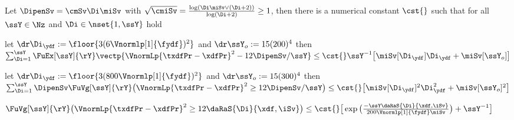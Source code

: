 \begin{lm}\label{ak:re:rest}Let $\DipenSv=\cmSv \Di \miSv$
  with
  $\sqrt{\cmiSv}=\tfrac{\log (\Di\miSv \vee
    (\Di+2))}{\log(\Di+2)}\geq1$, then there is a numerical constant
  $\cst{}$ such that for all $\ssY\in\Nz$ and
  $\Di\in\nset{1,\ssY}$ hold
  \begin{resListeN}[]
  \item\label{ak:re:rest:i} let $\dr\Di_{\ydf}:=\floor{  3(6\Vnormlp[1]{\fydf})^2}$ and $\dr \ssY_{o}:={15(200)^4}$ then\\ 
    $\sum_{\Di=1}^{\ssY}\FuEx[\ssY]{\rY}
    \vectp{\VnormLp{\txdfPr-\xdfPr}^2-12\DipenSv/\ssY}
    \leq \cst{}\ssY^{-1}\big[\miSv[\Di_{\ydf}]\Di_{\ydf}+ \miSv[\ssY_{o}]\big]$
  \item\label{ak:re:rest:ii} let
    $\dr\Di_{\ydf}:=\floor{3(800\Vnormlp[1]{\fydf})^2}$ and
    $\dr \ssY_{o}:=15({300})^4$ then\\
    $\sum_{\Di=1}^{\ssY}\DipenSv\FuVg[\ssY]{\rY}\big(\VnormLp{\txdfPr-\xdfPr}^2
    \geq12\DipenSv/\ssY\big)\leq\cst{}\big[\miSv[\Di_{\ydf}]^2\Di_{\ydf}^2+\miSv[\ssY_{o}]^2\big]$
  \item\label{ak:re:rest:iii} 
  $\FuVg[\ssY]{\rY}\big(\VnormLp{\txdfPr-\xdfPr}^2 \geq 12\daRaS{\Di}{\xdf,\iSv}\big)\leq 
    \cst{} \big[\exp\big(\tfrac{-\ssY\daRaS{\Di}{\xdf,\iSv}}{200\Vnormlp[1]{\fydf}\miSv}\big)+\ssY^{-1}\big]$
  \end{resListeN}
\end{lm}
